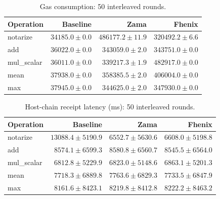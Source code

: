 \begin{table}[!t]
\centering\small
\caption{Gas consumption: 50 interleaved rounds.}
\label{tab:lifecycle-gasUsed}
\begin{tabular}{lrrr}
\hline
Operation & Baseline & Zama & Fhenix \\
\hline
notarize & \(34185.0 \pm 0.0\) & \(486177.2 \pm 11.9\) & \(320492.2 \pm 6.6\) \\
add & \(36022.0 \pm 0.0\) & \(343059.0 \pm 2.0\) & \(343751.0 \pm 0.0\) \\
mul\_scalar & \(36011.0 \pm 0.0\) & \(339217.3 \pm 1.9\) & \(482917.0 \pm 0.0\) \\
mean & \(37938.0 \pm 0.0\) & \(358385.5 \pm 2.0\) & \(406004.0 \pm 0.0\) \\
max & \(37945.0 \pm 0.0\) & \(344625.0 \pm 2.0\) & \(347930.0 \pm 0.0\) \\
\hline
\end{tabular}
\end{table}

\begin{table}[!t]
\centering\small
\caption{Host-chain receipt latency (ms): 50 interleaved rounds.}
\label{tab:lifecycle-confirmationMs}
\begin{tabular}{lrrr}
\hline
Operation & Baseline & Zama & Fhenix \\
\hline
notarize & \(13088.4 \pm 5190.9\) & \(6552.7 \pm 5630.6\) & \(6608.0 \pm 5198.8\) \\
add & \(8574.1 \pm 6599.3\) & \(8580.8 \pm 6560.7\) & \(8545.5 \pm 6564.0\) \\
mul\_scalar & \(6812.8 \pm 5229.9\) & \(6823.0 \pm 5148.6\) & \(6863.1 \pm 5201.3\) \\
mean & \(7718.3 \pm 6889.8\) & \(7763.6 \pm 6829.3\) & \(7733.5 \pm 6847.9\) \\
max & \(8161.6 \pm 8423.1\) & \(8219.8 \pm 8412.8\) & \(8222.2 \pm 8463.2\) \\
\hline
\end{tabular}
\end{table}

